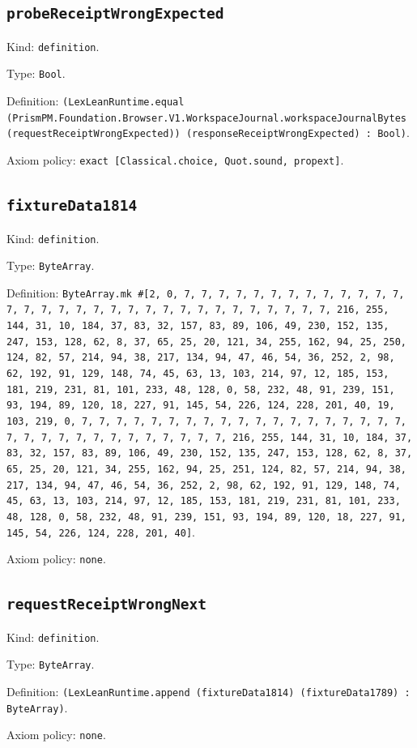 \documentclass[11pt]{article}
\begin{document}
\subsection*{\texttt{probeReceiptWrongExpected}}
\noindent Kind: \texttt{definition}.\par
\noindent Type: \texttt{Bool}.\par
\noindent Definition: \texttt{(LexLeanRuntime.equal (PrismPM.Foundation.Browser.V1.WorkspaceJournal.workspaceJournalBytes (requestReceiptWrongExpected)) (responseReceiptWrongExpected) : Bool)}.\par
\noindent Axiom policy: \texttt{exact [Classical.choice, Quot.sound, propext]}.\par
\subsection*{\texttt{fixtureData1814}}
\noindent Kind: \texttt{definition}.\par
\noindent Type: \texttt{ByteArray}.\par
\noindent Definition: \texttt{ByteArray.mk \#[2, 0, 7, 7, 7, 7, 7, 7, 7, 7, 7, 7, 7, 7, 7, 7, 7, 7, 7, 7, 7, 7, 7, 7, 7, 7, 7, 7, 7, 7, 7, 7, 7, 7, 216, 255, 144, 31, 10, 184, 37, 83, 32, 157, 83, 89, 106, 49, 230, 152, 135, 247, 153, 128, 62, 8, 37, 65, 25, 20, 121, 34, 255, 162, 94, 25, 250, 124, 82, 57, 214, 94, 38, 217, 134, 94, 47, 46, 54, 36, 252, 2, 98, 62, 192, 91, 129, 148, 74, 45, 63, 13, 103, 214, 97, 12, 185, 153, 181, 219, 231, 81, 101, 233, 48, 128, 0, 58, 232, 48, 91, 239, 151, 93, 194, 89, 120, 18, 227, 91, 145, 54, 226, 124, 228, 201, 40, 19, 103, 219, 0, 7, 7, 7, 7, 7, 7, 7, 7, 7, 7, 7, 7, 7, 7, 7, 7, 7, 7, 7, 7, 7, 7, 7, 7, 7, 7, 7, 7, 7, 7, 7, 7, 216, 255, 144, 31, 10, 184, 37, 83, 32, 157, 83, 89, 106, 49, 230, 152, 135, 247, 153, 128, 62, 8, 37, 65, 25, 20, 121, 34, 255, 162, 94, 25, 251, 124, 82, 57, 214, 94, 38, 217, 134, 94, 47, 46, 54, 36, 252, 2, 98, 62, 192, 91, 129, 148, 74, 45, 63, 13, 103, 214, 97, 12, 185, 153, 181, 219, 231, 81, 101, 233, 48, 128, 0, 58, 232, 48, 91, 239, 151, 93, 194, 89, 120, 18, 227, 91, 145, 54, 226, 124, 228, 201, 40]}.\par
\noindent Axiom policy: \texttt{none}.\par
\subsection*{\texttt{requestReceiptWrongNext}}
\noindent Kind: \texttt{definition}.\par
\noindent Type: \texttt{ByteArray}.\par
\noindent Definition: \texttt{(LexLeanRuntime.append (fixtureData1814) (fixtureData1789) : ByteArray)}.\par
\noindent Axiom policy: \texttt{none}.\par
\end{document}
